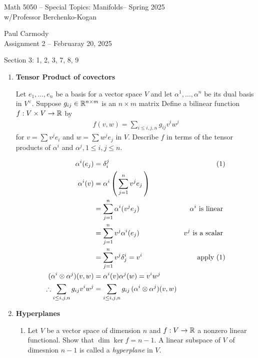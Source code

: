 \documentclass[10pt,a4paper]{report}
\newcommand{\CLASSNAME}{Math 5050 -- Special Topics: Manifolds}
\newcommand{\STUDENTNAME}{Paul Carmody}
\newcommand{\ASSIGNMENT}{Assignment 2 }
\newcommand{\DUEDATE}{Februaray 20, 2025}
\newcommand{\SEMESTER}{Spring 2025}
\newcommand{\BLUE}[1]{\textcolor{blue}{#1}}
\begin{document}
\begin{center}
	\Large{\CLASSNAME -- \SEMESTER} \\
	\large{ w/Professor Berchenko-Kogan}
\end{center}
\begin{center}
	\STUDENTNAME \\
	\ASSIGNMENT -- \DUEDATE\\
\end{center} 

\noindent Section 3: 1, 2, 3, 7, 8, 9\\

\begin{enumerate}[label=3.\arabic*.]

	\item \textbf{Tensor Product of covectors}
	
	Let $e_1, \dots, e_n$ be a basis for a vector space $V$ and let $\alpha^1, \dots, \alpha^n$ be its dual basis in $V^\vee$.  Suppose $g_{ij}\in \mathbb{R}^{n\times m}$ is an $n \times m$ matrix Define a bilinear function $f: V\times V \to \mathbb{R}$ by 
	\begin{align*}
		f(v,w) = \sum_{i\le i,j, n} g_{ij}v^i w^j
	\end{align*}for $v=\sum v^j e_i$ and $w=\sum w^j e_j$ in $V$.  Describe $f$ in terms of the tensor products of $\alpha^i$ and $\alpha^j, 1 \le i,j \le n$.
	
	\BLUE{\begin{align*}
		\alpha^i(e_j) &= \delta^j_i & (1)\\
		\alpha^i(v) &= \alpha^i\left (\, \sum_{j=1}^n v^je_j \,\right ) \\
		 & =\sum_{j=1}^n \alpha^i(v^je_j) & \alpha^i \text{ is linear } \\
		 & =\sum_{j=1}^n v^j\alpha^i(e_j) & v^j \text{ is a scalar }\\
		 & =\sum_{j=1}^n v^j\delta^i_j=v^i & \text{apply (1)}\\
		(\alpha^i\otimes\alpha^j)(v,w) &= \alpha^i(v)\alpha^j(w) = v^iw^j\\
		\therefore \sum_{i\le i,j, n} g_{ij}v^i w^j &= \sum_{i\le i,j, n} g_{ij}\,(\alpha^i\otimes\alpha^j)(v,w) 
	\end{align*}
	}
	
	\item \textbf{Hyperplanes}
	
	\begin{enumerate}[label=(\alph*)]
	
		\item Let $V$ be a vector space of dimension $n$ and $f:V \to \mathbb{R}$ a nonzero linear functional.  Show that $\dim\ker f = n-1$.  A linear subspace of $V$ of dimesnion $n-1$ is called a \textit{hyperplane} in $V$.
		

\end{enumerate}
\end{enumerate}
\end{document}
